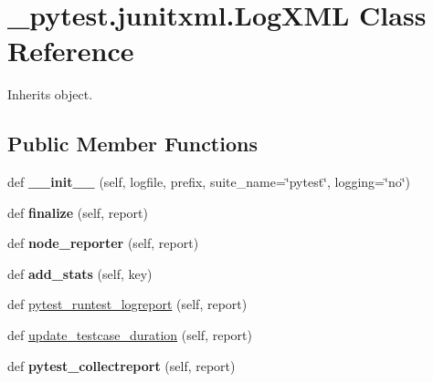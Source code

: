 \hypertarget{class__pytest_1_1junitxml_1_1_log_x_m_l}{}\section{\+\_\+pytest.\+junitxml.\+Log\+X\+ML Class Reference}
\label{class__pytest_1_1junitxml_1_1_log_x_m_l}


Inherits object.

\subsection*{Public Member Functions}
\begin{DoxyCompactItemize}
\item 
\mbox{\label{class__pytest_1_1junitxml_1_1_log_x_m_l_a71844c0b0669bb087d2de6a952511747}} 
def {\bfseries \+\_\+\+\_\+init\+\_\+\+\_\+} (self, logfile, prefix, suite\+\_\+name=\char`\"{}pytest\char`\"{}, logging=\char`\"{}no\char`\"{})
\item 
\mbox{\label{class__pytest_1_1junitxml_1_1_log_x_m_l_a87419ea6d5f427ac773a1d169191d46c}} 
def {\bfseries finalize} (self, report)
\item 
\mbox{\label{class__pytest_1_1junitxml_1_1_log_x_m_l_a4aeb432a06907b059b824db1d4f16938}} 
def {\bfseries node\+\_\+reporter} (self, report)
\item 
\mbox{\label{class__pytest_1_1junitxml_1_1_log_x_m_l_ae299377b8b602ac4ad8a61f308dbd306}} 
def {\bfseries add\+\_\+stats} (self, key)
\item 
def \hyperlink{class__pytest_1_1junitxml_1_1_log_x_m_l_a4f6e1a407df493153752af6b45889fc4}{pytest\+\_\+runtest\+\_\+logreport} (self, report)
\item 
def \hyperlink{class__pytest_1_1junitxml_1_1_log_x_m_l_af9cabebf026496f03c7b45c3c86662fb}{update\+\_\+testcase\+\_\+duration} (self, report)
\item 
\mbox{\label{class__pytest_1_1junitxml_1_1_log_x_m_l_ad653fde8a73b1a070a4b499ee12a28aa}} 
def {\bfseries pytest\+\_\+collectreport} (self, report)

\end{DoxyCompactItemize}
